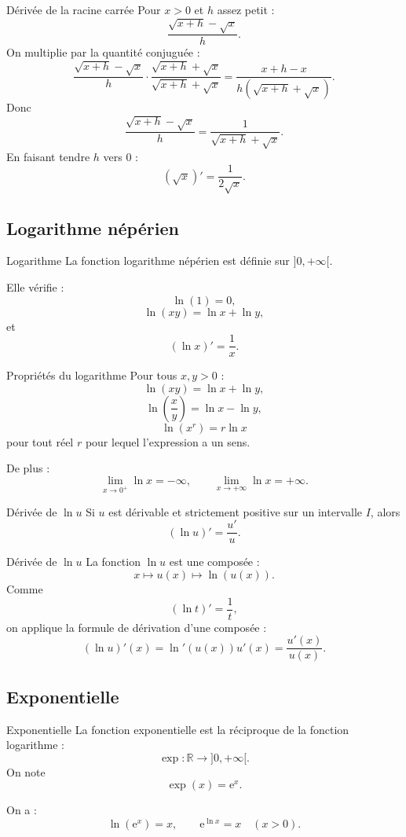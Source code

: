 \documentclass[11pt,a4paper]{article}
\newcommand{\R}{\mathbb{R}}
\newcommand{\e}{\mathrm{e}}
\begin{document}
\begin{proofbox}{Dérivée de la racine carrée}
Pour $x>0$ et $h$ assez petit :
\[
\frac{\sqrt{x+h}-\sqrt{x}}{h}.
\]
On multiplie par la quantité conjuguée :
\[
\frac{\sqrt{x+h}-\sqrt{x}}{h}
\cdot
\frac{\sqrt{x+h}+\sqrt{x}}{\sqrt{x+h}+\sqrt{x}}
=
\frac{x+h-x}{h(\sqrt{x+h}+\sqrt{x})}.
\]
Donc
\[
\frac{\sqrt{x+h}-\sqrt{x}}{h}
=
\frac1{\sqrt{x+h}+\sqrt{x}}.
\]
En faisant tendre $h$ vers $0$ :
\[
(\sqrt{x})'=\frac1{2\sqrt{x}}.
\]
\end{proofbox}

\subsection{Logarithme népérien}

\begin{definitionbox}{Logarithme}
La fonction logarithme népérien est définie sur $]0,+\infty[$.

Elle vérifie :
\[
\ln(1)=0,
\]
\[
\ln(xy)=\ln x+\ln y,
\]
et
\[
(\ln x)'=\frac1x.
\]
\end{definitionbox}

\begin{theorembox}{Propriétés du logarithme}
Pour tous $x,y>0$ :
\[
\ln(xy)=\ln x+\ln y,
\]
\[
\ln\left(\frac xy\right)=\ln x-\ln y,
\]
\[
\ln(x^r)=r\ln x
\]
pour tout réel $r$ pour lequel l'expression a un sens.

De plus :
\[
\lim_{x\to0^+}\ln x=-\infty,
\qquad
\lim_{x\to+\infty}\ln x=+\infty.
\]
\end{theorembox}

\begin{theorembox}{Dérivée de $\ln u$}
Si $u$ est dérivable et strictement positive sur un intervalle $I$, alors
\[
(\ln u)'=\frac{u'}u.
\]
\end{theorembox}

\begin{proofbox}{Dérivée de $\ln u$}
La fonction $\ln u$ est une composée :
\[
x\mapsto u(x)\mapsto \ln(u(x)).
\]
Comme
\[
(\ln t)'=\frac1t,
\]
on applique la formule de dérivation d'une composée :
\[
(\ln u)'(x)=\ln'(u(x))u'(x)=\frac{u'(x)}{u(x)}.
\]
\end{proofbox}

\subsection{Exponentielle}

\begin{definitionbox}{Exponentielle}
La fonction exponentielle est la réciproque de la fonction logarithme :
\[
\exp : \R\to]0,+\infty[.
\]
On note
\[
\exp(x)=\e^x.
\]

On a :
\[
\ln(\e^x)=x,
\qquad
\e^{\ln x}=x\quad(x>0).
\]
\end{definitionbox}
\end{document}
